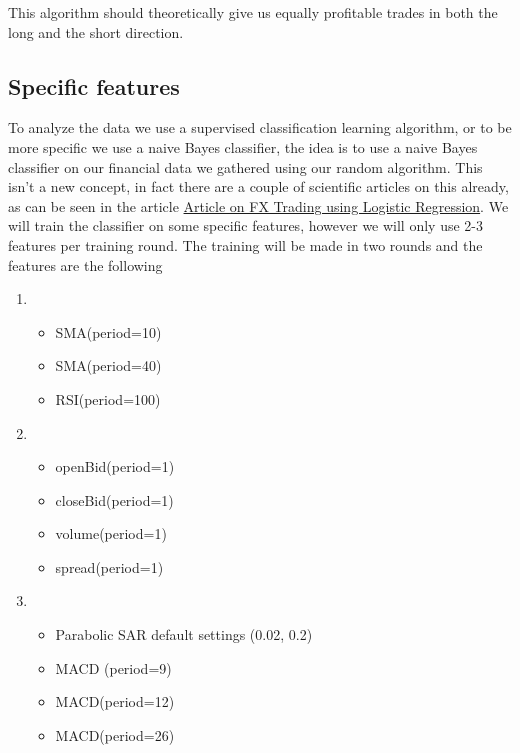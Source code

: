\documentclass[10pt]{IEEEtran}
\begin{document}
This algorithm should theoretically give us equally profitable trades in both the long and the short direction.

\subsection{Specific features}
To analyze the data we use a supervised classification learning algorithm, or to be more specific we use a naive Bayes classifier, the idea is to use a naive Bayes classifier on our financial data we gathered using our random algorithm. This isn't a new concept, in fact there are a couple of scientific articles on this already, as can be seen in the article \href{http://www.jsst.jp/e/JSST2012/extended_abstract/pdf/11.pdf}{Article on FX Trading using Logistic Regression}. We will train the classifier on some specific features, however we will only use 2-3 features per training round. The training will be made in two rounds and the features are the following
\begin{enumerate}
\item{
	\begin{itemize}
		\item{SMA(period=10)}
		\item{SMA(period=40)}
		\item{RSI(period=100)}
	\end{itemize}
}
\item{
	\begin{itemize}
		\item{openBid(period=1)}
		\item{closeBid(period=1)}
		\item{volume(period=1)}
		\item{spread(period=1)}
	\end{itemize}
}
\item{
	\begin{itemize}
		\item{Parabolic SAR default settings (0.02, 0.2)}
		\item{MACD (period=9)}
		\item{MACD(period=12)}
		\item{MACD(period=26)}		
	\end{itemize}
}
\end{enumerate}
\end{document}
